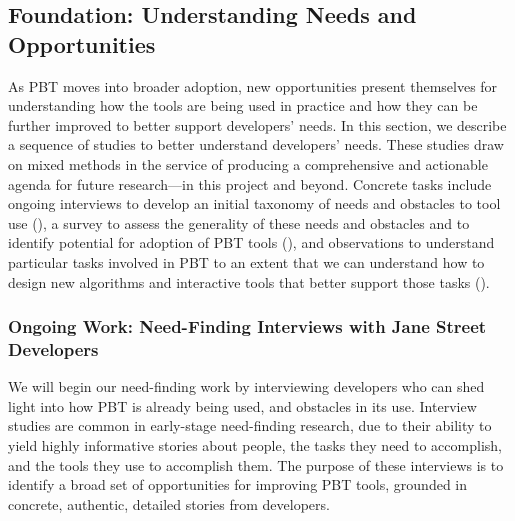 



\subsection{Foundation: Understanding Needs and Opportunities }\label{sec:foundation}

As PBT moves into broader adoption, new opportunities present
themselves for understanding how
the tools are being used in practice and how they can be further
improved to better support developers' needs. In this section, we describe a
sequence of studies to better understand developers' needs.
These studies draw on mixed methods in the service of producing a
comprehensive and actionable agenda for future research---in this
project and beyond.  Concrete tasks include ongoing interviews to
develop an initial taxonomy of needs and
obstacles to tool use (), a survey to assess the
generality of these needs and obstacles and to identify potential for adoption
of PBT tools (), and observations to understand
particular tasks involved in PBT to an extent that we can understand how to
design new algorithms and interactive tools that better support those tasks
().

\subsubsection{Ongoing Work: Need-Finding Interviews with Jane Street Developers}
\label{sec:interviews}

We will begin our need-finding work by interviewing developers who can shed
light into how PBT is already being used, and obstacles in its use. Interview
studies are common in early-stage need-finding research, due to their ability
to yield highly informative stories about people, the tasks they need to
accomplish, and the tools they use to accomplish them. The purpose of these
interviews is to identify a broad set of opportunities for improving PBT tools,
grounded in concrete, authentic, detailed stories from developers.

